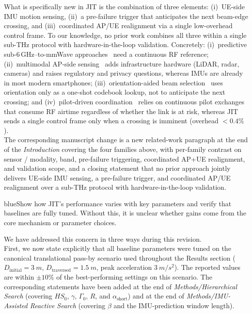 \documentclass{article}
\newcommand{\blue}[1]{\begin{color}{blue}#1\end{color}}
\begin{document}
\noindent What is specifically new in JIT is the combination of three elements: (i)~UE-side IMU motion sensing, (ii)~a pre-failure trigger that anticipates the next beam-edge crossing, and (iii)~coordinated AP/UE realignment via a single low-overhead control frame. To our knowledge, no prior work combines all three within a single sub-THz protocol with hardware-in-the-loop validation. Concretely: (i)~predictive sub-6\,GHz–to-mmWave approaches~\cite{Alrabeiah2020DeepLearning} need a continuous RF reference; (ii)~multimodal AP-side sensing~\cite{Alkhateeb2023DeepSense, Jiang2023LiDAR, Morais2023Position} adds infrastructure hardware (LiDAR, radar, cameras) and raises regulatory and privacy questions, whereas IMUs are already in most modern smartphones; (iii)~orientation-aided beam selection~\cite{Rezaie2022Orientation, Struye2023CoVRage} uses orientation only as a one-shot codebook lookup, not to anticipate the next crossing; and (iv)~pilot-driven coordination~\cite{Alkhateeb2018DLCB, Xue2023Standardization} relies on continuous pilot exchanges that consume RF airtime regardless of whether the link is at risk, whereas JIT sends a single control frame only when a crossing is imminent (overhead $<0.4\%$).\\

\noindent The corresponding manuscript change is a new related-work paragraph at the end of the \emph{Introduction} covering the four families above, with per-family contrast on sensor / modality, band, pre-failure triggering, coordinated AP+UE realignment, and validation scope, and a closing statement that no prior approach jointly delivers UE-side IMU sensing, a pre-failure trigger, and coordinated AP/UE realignment over a sub-THz protocol with hardware-in-the-loop validation.

\begin{tcbremark}
{\selectfont
\blue{Show how JIT's performance varies with key parameters and verify that baselines are fully tuned. Without this, it is unclear whether gains come from the core mechanism or parameter choices.}
}
\end{tcbremark}

\noindent We have addressed this concern in three ways during this revision.\\

\noindent First, we now state explicitly that all baseline parameters were tuned on the canonical translational pass-by scenario used throughout the Results section ($D_{\text{initial}} = \SI{3}{m}$, $D_{\text{traversed}} = \SI{1.5}{m}$, peak acceleration $\SI{3}{m/s^2}$). The reported values are within $\pm10\%$ of the best-performing settings on this scenario. The corresponding statements have been added at the end of \emph{Methods/Hierarchical Search} (covering $HS_0$, $\gamma$, $\Gamma_0$, $R$, and $\alpha_{\text{short}}$) and at the end of \emph{Methods/IMU-Assisted Reactive Search} (covering $\beta$ and the IMU-prediction window length).\\
\end{document}
